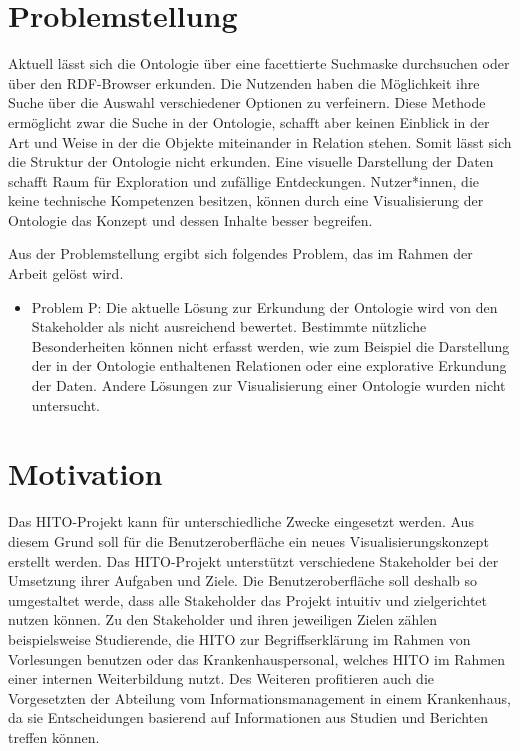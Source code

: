 \section{Problemstellung}\label{sec:problemstellung}

Aktuell lässt sich die Ontologie über eine facettierte Suchmaske durchsuchen oder über den RDF-Browser erkunden. 
Die Nutzenden haben die Möglichkeit ihre Suche über die Auswahl verschiedener Optionen zu verfeinern.
Diese Methode ermöglicht zwar die Suche in der Ontologie, schafft aber keinen Einblick in der Art und Weise in der die Objekte miteinander in Relation stehen.
Somit lässt sich die Struktur der Ontologie nicht erkunden.
Eine visuelle Darstellung der Daten schafft Raum für Exploration und zufällige Entdeckungen. 
Nutzer*innen, die keine technische Kompetenzen besitzen, können durch eine Visualisierung der Ontologie das Konzept und dessen Inhalte besser begreifen. \citep[vgl.]{linkeddatavisualization} \newline
\newline

Aus der Problemstellung ergibt sich folgendes Problem, das im Rahmen der Arbeit gelöst wird.

\begin{itemize}
\item Problem P: Die aktuelle Lösung zur Erkundung der Ontologie wird von den Stakeholder als nicht ausreichend bewertet.
Bestimmte nützliche Besonderheiten können nicht erfasst werden, wie zum Beispiel die Darstellung der in der Ontologie enthaltenen Relationen oder eine explorative Erkundung der Daten. 
Andere Lösungen zur Visualisierung einer Ontologie wurden nicht untersucht.
\end{itemize}

\section{Motivation}\label{sec:motivation}

Das HITO-Projekt kann für unterschiedliche Zwecke eingesetzt werden. 
Aus diesem Grund soll für die Benutzeroberfläche ein neues Visualisierungskonzept erstellt werden. 
Das HITO-Projekt unterstützt verschiedene Stakeholder bei der Umsetzung ihrer Aufgaben und Ziele.
Die Benutzeroberfläche soll deshalb so umgestaltet werde, dass alle Stakeholder das Projekt intuitiv und zielgerichtet nutzen können.
Zu den Stakeholder und ihren jeweiligen Zielen zählen beispielsweise Studierende, die HITO zur Begriffserklärung im Rahmen von Vorlesungen benutzen oder das Krankenhauspersonal, welches HITO im Rahmen einer internen Weiterbildung nutzt. 
Des Weiteren profitieren auch die Vorgesetzten der Abteilung vom Informationsmanagement in einem Krankenhaus, da sie Entscheidungen basierend auf Informationen aus Studien und Berichten treffen können.

